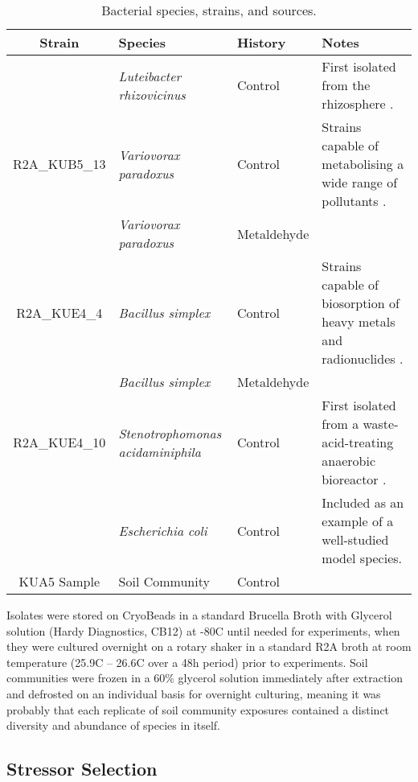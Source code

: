 \documentclass[review,12pt]{elsarticle}
\begin{document}
\begin{table}[h]
\centering
\scriptsize
\begin{tabular}{c p{3.2cm} l p{4.8cm}}
\toprule 
{Strain} & {Species} & {History} & {Notes} \\
\midrule
\rowcolor{black!20}{R2A\_LUF4\_5} & \textit{Luteibacter rhizovicinus} & Control & First isolated from the rhizosphere \cite{Johansen2005LuteibacterL.}.\\
{R2A\_KUB5\_13} & \textit{Variovorax paradoxus} & Control & Strains capable of metabolising a wide range of pollutants \cite{Satola2013MetabolicParadoxus}.\\
\rowcolor{black!20}{R2A\_NUF1\_3} & \textit{Variovorax paradoxus} & Metaldehyde & \\
{R2A\_KUE4\_4} & \textit{Bacillus simplex} & Control & Strains capable of biosorption of heavy metals and radionuclides \cite{Valentine1996BiosorptionZone}.\\
\rowcolor{black!20}{R2A\_NUE1\_1} & \textit{Bacillus simplex} & Metaldehyde & \\
{R2A\_KUE4\_10} & \textit{Stenotrophomonas \newline acidaminiphila} & Control & First isolated from a waste-acid-treating anaerobic bioreactor \cite{Assih2002}.\\
\rowcolor{black!20}{OP50} & \textit{Escherichia coli} & Control & Included as an example of a well-studied model species.\\
{KUA5 Sample} & Soil Community & Control & \\
\bottomrule
\end{tabular}
\caption{Bacterial species, strains, and sources.}
\label{tab:isolates}
\end{table}

Isolates were stored on CryoBeads in a standard Brucella Broth with Glycerol solution (Hardy Diagnostics, CB12) at -80\textdegree C until needed for experiments, when they were cultured overnight on a rotary shaker in a standard R2A broth at room temperature (25.9\textdegree C – 26.6\textdegree C over a 48h period) prior to experiments. Soil communities were frozen in a 60\% glycerol solution immediately after extraction and defrosted on an individual basis for overnight culturing, meaning it was probably that each replicate of soil community exposures contained a distinct diversity and abundance of species in itself. 

\subsection{Stressor Selection}
\label{S:2:2}
\end{document}

